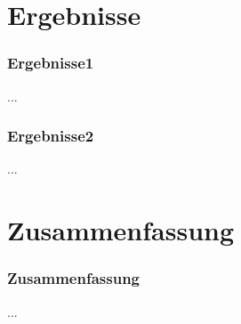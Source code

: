 \documentclass[student, noshadow, itr, english, aspectratio=169]{ITR_LSR_slides}
\begin{document}
\section{Ergebnisse}

\begin{frame}
	\frametitle{Ergebnisse1}
	...
\end{frame}

\begin{frame}
	\frametitle{Ergebnisse2}
	...
\end{frame}



\section{Zusammenfassung}

\begin{frame}
	\frametitle{Zusammenfassung}
	...
\end{frame}

\appendix
\end{document}

